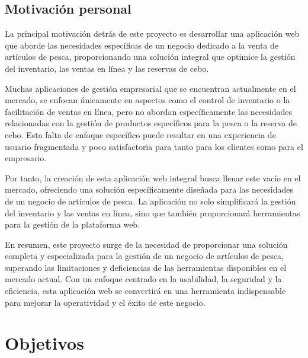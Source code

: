 \section{Motivación personal}\label{sec:apartado}


La principal motivación detrás de este proyecto es desarrollar una aplicación web que aborde las necesidades específicas de un negocio dedicado a la venta de artículos de pesca, proporcionando una solución integral que optimice la gestión del inventario, las ventas en línea y las reservas de cebo.

\vspace{0.5cm}


Muchas aplicaciones de gestión empresarial que se encuentran actualmente en el mercado, se enfocan únicamente en aspectos como el control de inventario o la facilitación de ventas en línea, pero no abordan específicamente las necesidades relacionadas con la gestión de productos específicos para la pesca o la reserva de cebo. Esta falta de enfoque específico puede resultar en una experiencia de usuario fragmentada y poco satisfactoria para tanto para los clientes como para el empresario.

\vspace{0.5cm}

Por tanto, la creación de esta aplicación web integral busca llenar este vacío en el mercado, ofreciendo una solución específicamente diseñada para las necesidades de un negocio de artículos de pesca. La aplicación no solo simplificará la gestión del inventario y las ventas en línea, sino que también proporcionará herramientas para la gestión de la plataforma web.

\vspace{0.5cm}

En resumen, este proyecto surge de la necesidad de proporcionar una solución completa y especializada para la gestión de un negocio de artículos de pesca, superando las limitaciones y deficiencias de las herramientas disponibles en el mercado actual. Con un enfoque centrado en la usabilidad, la seguridad y la eficiencia, esta aplicación web se convertirá en una herramienta indispensable para mejorar la operatividad y el éxito de este negocio.

\vspace{0.5cm}

\chapter{Objetivos}\label{cap:cap2}


